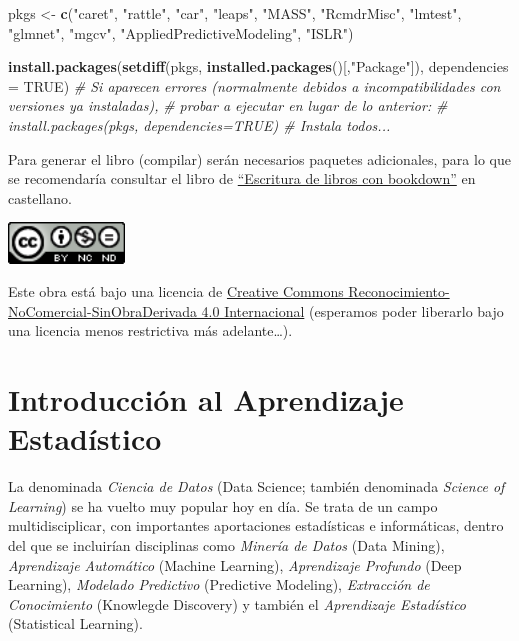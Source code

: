 \documentclass[]{book}
\newenvironment{Shaded}{\begin{snugshade}}{\end{snugshade}}
\newcommand{\KeywordTok}[1]{\textcolor[rgb]{0.13,0.29,0.53}{\textbf{#1}}}
\newcommand{\DataTypeTok}[1]{\textcolor[rgb]{0.13,0.29,0.53}{#1}}
\newcommand{\StringTok}[1]{\textcolor[rgb]{0.31,0.60,0.02}{#1}}
\newcommand{\CommentTok}[1]{\textcolor[rgb]{0.56,0.35,0.01}{\textit{#1}}}
\newcommand{\OtherTok}[1]{\textcolor[rgb]{0.56,0.35,0.01}{#1}}
\newcommand{\NormalTok}[1]{#1}
\theoremstyle{break}
\theoremstyle{definition}
\theoremstyle{definition}
\theoremstyle{definition}
\theoremstyle{remark}
\begin{document}
\begin{Shaded}
\begin{Highlighting}[]
\NormalTok{pkgs <-}\StringTok{ }\KeywordTok{c}\NormalTok{(}\StringTok{"caret"}\NormalTok{, }\StringTok{"rattle"}\NormalTok{, }\StringTok{"car"}\NormalTok{, }\StringTok{"leaps"}\NormalTok{, }\StringTok{"MASS"}\NormalTok{, }\StringTok{"RcmdrMisc"}\NormalTok{, }
          \StringTok{"lmtest"}\NormalTok{, }\StringTok{"glmnet"}\NormalTok{, }\StringTok{"mgcv"}\NormalTok{, }
          \StringTok{"AppliedPredictiveModeling"}\NormalTok{, }\StringTok{"ISLR"}\NormalTok{)}

\KeywordTok{install.packages}\NormalTok{(}\KeywordTok{setdiff}\NormalTok{(pkgs, }\KeywordTok{installed.packages}\NormalTok{()[,}\StringTok{"Package"}\NormalTok{]), }\DataTypeTok{dependencies =} \OtherTok{TRUE}\NormalTok{)}
\CommentTok{# Si aparecen errores (normalmente debidos a incompatibilidades con versiones ya instaladas), }
\CommentTok{# probar a ejecutar en lugar de lo anterior:}
\CommentTok{# install.packages(pkgs, dependencies=TRUE) # Instala todos...}
\end{Highlighting}
\end{Shaded}

Para generar el libro (compilar) serán necesarios paquetes adicionales,
para lo que se recomendaría consultar el libro de
\href{https://rubenfcasal.github.io/bookdown_intro}{``Escritura de
libros con bookdown''} en castellano.

\includegraphics[width=1.22in]{images/by-nc-nd-88x31}

Este obra está bajo una licencia de
\href{https://creativecommons.org/licenses/by-nc-nd/4.0/deed.es_ES}{Creative
Commons Reconocimiento-NoComercial-SinObraDerivada 4.0 Internacional}
(esperamos poder liberarlo bajo una licencia menos restrictiva más
adelante\ldots{}).

\chapter{Introducción al Aprendizaje Estadístico}\label{intro-AE}

La denominada \emph{Ciencia de Datos} (Data Science; también denominada
\emph{Science of Learning}) se ha vuelto muy popular hoy en día. Se
trata de un campo multidisciplicar, con importantes aportaciones
estadísticas e informáticas, dentro del que se incluirían disciplinas
como \emph{Minería de Datos} (Data Mining), \emph{Aprendizaje
Automático} (Machine Learning), \emph{Aprendizaje Profundo} (Deep
Learning), \emph{Modelado Predictivo} (Predictive Modeling),
\emph{Extracción de Conocimiento} (Knowlegde Discovery) y también el
\emph{Aprendizaje Estadístico} (Statistical Learning).
\end{document}
